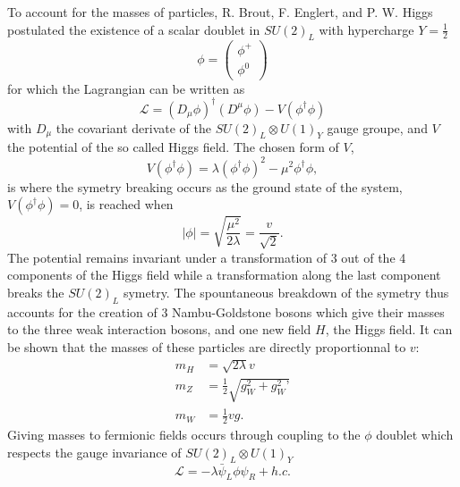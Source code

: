     To account for the masses of particles, R. Brout, F. Englert, and P. W. Higgs postulated the existence of a scalar doublet in $ SU(2)_L $ with hypercharge $ Y = \frac{1}{2} $
    \begin{equation}
      \phi = \left( \begin{matrix} \phi^+ \\ \phi^0 \end{matrix} \right)
    \end{equation}
    for which the Lagrangian can be written as
    \begin{equation}
      \mathcal{L} = \left( D_\mu \phi \right)^\dagger \left( D^\mu \phi \right) - V(\phi^\dagger \phi)
    \end{equation}
    with $ D_\mu $ the covariant derivate of the $ SU(2)_L \otimes U(1)_Y $ gauge groupe, and $ V $ the potential of the so called Higgs field. The chosen form of $ V $,
    \begin{equation}
      V(\phi^\dagger \phi) = \lambda \left( \phi^\dagger \phi \right)^2 - \mu^2 \phi^\dagger \phi ,
    \end{equation}
    is where the symetry breaking occurs as the ground state of the system, $ V(\phi^\dagger \phi) = 0 $, is reached when
    \begin{equation}
      \left| \phi \right| = \sqrt{\frac{\mu^2}{2 \lambda}} = \frac{v}{\sqrt{2}} .
    \end{equation}
    The potential remains invariant under a transformation of 3 out of the 4 components of the Higgs field while a transformation along the last component breaks the $ SU(2)_L $ symetry. The spountaneous breakdown of the symetry thus accounts for the creation of 3 Nambu-Goldstone bosons which give their masses to the three weak interaction bosons, and one new field $ H $, the Higgs field. It can be shown that the masses of these particles are directly proportionnal to $ v $:
    \begin{align}
      m_H & = \sqrt{2 \lambda} v \\
      m_Z & = \frac{1}{2} \sqrt{g_W^2 + g_W^2\text{'}} \\
      m_W & = \frac{1}{2} v g .
    \end{align}
    Giving masses to fermionic fields occurs through coupling to the $ \phi $ doublet which respects the gauge invariance of $ SU(2)_L \otimes U(1)_Y $
    \begin{equation}
      \mathcal{L} = - \lambda \bar{\psi}_L \phi \psi_R + h.c.
    \end{equation} \\

